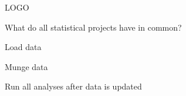LOGO

What do all statistical projects have in common?

Load data

Munge data

Run all analyses after data is updated
